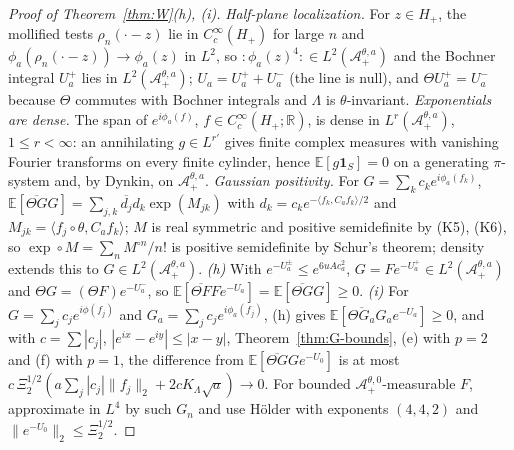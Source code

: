 \documentclass[11pt]{article}
\theoremstyle{plain}
\theoremstyle{definition}
\theoremstyle{remark}
\newcommand{\R}{\mathbb{R}}
\newcommand{\E}{\mathbb{E}}
\newcommand{\cA}{\mathcal{A}}
\newcommand{\ind}{\mathbf{1}}
\newcommand{\conj}[1]{\overline{#1}}
\begin{document}
\begin{proof}[Proof of Theorem~\ref{thm:W}(h), (i)]
\emph{Half-plane localization.} For $z\in H_+$, the mollified tests $\rho_n(\cdot-z)$ lie in
$C_c^{\infty}(H_+)$ for large $n$ and $\phi_a(\rho_n(\cdot-z))\to\phi_a(z)$ in $L^{2}$, so ${:}\phi_a(z)^{4}{:}\in L^{2}(\cA^{\theta,a}_{+})$
and the Bochner integral $U^{+}_a$ lies in $L^{2}(\cA^{\theta,a}_{+})$; $U_a=U^{+}_a+U^{-}_a$ (the line is null),
and $\Theta U^{+}_a=U^{-}_a$ because $\Theta$ commutes with Bochner integrals and $\Lambda$ is
$\theta$-invariant. \emph{Exponentials are dense.} The span of $e^{i\phi_a(f)}$, $f\in C_c^{\infty}(H_+;\R)$, is
dense in $L^{r}(\cA^{\theta,a}_{+})$, $1\le r<\infty$: an annihilating $g\in L^{r'}$ gives finite complex
measures with vanishing Fourier transforms on every finite cylinder, hence
$\E[g\ind_S]=0$ on a generating $\pi$-system and, by Dynkin, on $\cA^{\theta,a}_{+}$.
\emph{Gaussian positivity.} For $G=\sum_kc_ke^{i\phi_a(f_k)}$,
$\E[\conj{\Theta G}G]=\sum_{j,k}\conj{d_j}d_k\exp(M_{jk})$ with $d_k=c_ke^{-\langle f_k,C_af_k\rangle/2}$ and
$M_{jk}=\langle f_j\circ\theta,C_af_k\rangle$; $M$ is real symmetric and positive semidefinite by (K5), (K6), so
$\exp\circ M=\sum_nM^{\circ n}/n!$ is positive semidefinite by Schur's theorem; density extends
this to $G\in L^{2}(\cA^{\theta,a}_{+})$. \emph{(h)} With $e^{-U^{\pm}_a}\le e^{6uAc_a^{2}}$, $G=Fe^{-U^{+}_a}\in L^{2}(\cA^{\theta,a}_{+})$
and $\Theta G=(\Theta F)e^{-U^{-}_a}$, so $\E[\conj{\Theta F}Fe^{-U_a}]=\E[\conj{\Theta G}G]\ge0$. \emph{(i)} For
$G=\sum_jc_je^{i\phi(f_j)}$ and $G_a=\sum_jc_je^{i\phi_a(f_j)}$, (h) gives $\E[\conj{\Theta G_a}G_ae^{-U_a}]\ge0$, and with
$c=\sum|c_j|$, $|e^{ix}-e^{iy}|\le|x-y|$, Theorem~\ref{thm:G-bounds}, (e) with $p=2$ and (f) with $p=1$,
the difference from $\E[\conj{\Theta G}Ge^{-U_0}]$ is at most $c\,\Xi_2^{1/2}(a\sum_j|c_j|\|f_j\|_2+2cK_\Lambda\sqrt a)\to0$. For
bounded $\cA^{\theta,0}_{+}$-measurable $F$, approximate in $L^{4}$ by such $G_n$ and use H\"older with
exponents $(4,4,2)$ and $\|e^{-U_0}\|_2\le\Xi_2^{1/2}$.
\end{proof}
\end{document}
